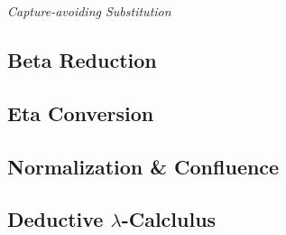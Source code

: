 \emph{Capture-avoiding Substitution}

\subsection{Beta Reduction}\label{sec:beta_reduction}

\subsection{Eta Conversion}\label{sec:eta_conversion}

\subsection{Normalization \& Confluence}\label{sec:normalization_confluence}



\subsection{Deductive $\lambda$-Calclulus}
